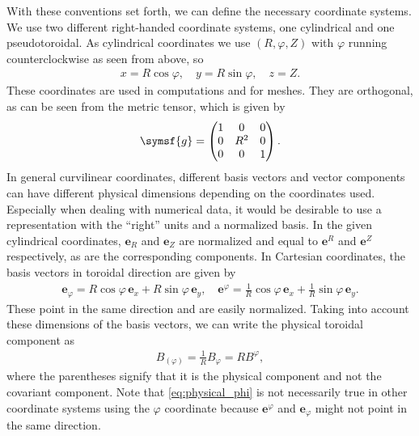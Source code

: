 \documentclass[a4paper, twoside, 10pt, english]{article}
\numberwithin{equation}{section}
\let\temp\varrho
\let\varrho\rho
\let\rho\temp
\let\temp\vartheta
\let\vartheta\theta
\let\theta\temp
\let\temp\varphi
\let\varphi\phi
\let\phi\temp
\let\vec\symbf
\begin{document}
With these conventions set forth, we can define the necessary coordinate systems. We use two different right-handed coordinate systems, one cylindrical and one pseudotoroidal. As cylindrical coordinates we use $(R, \phi, Z)$ with $\phi$ running counterclockwise as seen from above, so
\begin{gather}
  x = R \cos \phi, \quad y = R \sin \phi, \quad z = Z.
\end{gather}
These coordinates are used in computations and for meshes. They are orthogonal, as can be seen from the metric tensor, which is given by
\begin{gather}
  \symsf{g} = \begin{pmatrix}
    1 & 0 & 0 \\
    0 & R^{2} & 0 \\
    0 & 0 & 1
  \end{pmatrix}.
\end{gather}
In general curvilinear coordinates, different basis vectors and vector components can have different physical dimensions depending on the coordinates used. Especially when dealing with numerical data, it would be desirable to use a representation with the \enquote{right} units and a normalized basis. In the given cylindrical coordinates, $\vec{e}_{R}$ and $\vec{e}_{Z}$ are normalized and equal to $\vec{e}^{R}$ and $\vec{e}^{Z}$ respectively, as are the corresponding components. In Cartesian coordinates, the basis vectors in toroidal direction are given by
\begin{gather}
  \vec{e}_{\phi} = R \cos \phi \, \vec{e}_{x} + R \sin \phi \, \vec{e}_{y}, \quad \vec{e}^{\phi} = \frac{1}{R} \cos \phi \, \vec{e}_{x} + \frac{1}{R} \sin \phi \, \vec{e}_{y}.
\end{gather}
These point in the same direction and are easily normalized. Taking into account these dimensions of the basis vectors, we can write the physical toroidal component as
\begin{gather}
  B_{(\phi)} = \frac{1}{R} B_{\phi} = R B^{\phi}, \label{eq:physical_phi}
\end{gather}
where the parentheses signify that it is the physical component and not the covariant component. Note that \cref{eq:physical_phi} is not necessarily true in other coordinate systems using the $\phi$ coordinate because $\vec{e}^{\phi}$ and $\vec{e}_{\phi}$ might not point in the same direction.
\end{document}
